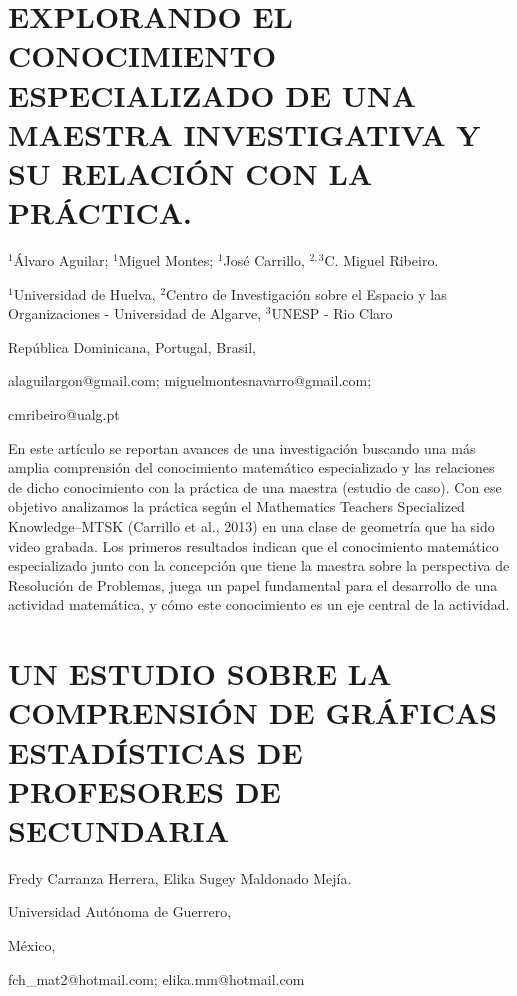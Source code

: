 \section{\uppercase{ Explorando el Conocimiento especializado de una maestra
investigativA y su relación con la práctica.}}

\begin{datos}

$^{1}$Álvaro Aguilar; $^{1}$Miguel Montes; $^{1}$José Carrillo,
$^{2,3}$C. Miguel Ribeiro.

$^{1}$Universidad de Huelva, $^{2}$Centro de Investigación sobre
el Espacio y las Organizaciones - Universidad de Algarve, $^{3}$UNESP
- Rio Claro 

República Dominicana, Portugal, Brasil,

alaguilargon@gmail.com; miguelmontesnavarro@gmail.com; 

cmribeiro@ualg.pt 

\end{datos}

En este artículo se reportan avances de una investigación buscando
una más amplia comprensión del conocimiento matemático especializado
y las relaciones de dicho conocimiento con la práctica de una maestra
(estudio de caso). Con ese objetivo analizamos la práctica según el
Mathematics Teachers Specialized Knowledge–MTSK (Carrillo et al.,
2013) en una clase de geometría que ha sido video grabada. Los primeros
resultados indican que el conocimiento matemático especializado junto
con la concepción que tiene la maestra sobre la perspectiva de Resolución
de Problemas, juega un papel fundamental para el desarrollo de una
actividad matemática, y cómo este conocimiento es un eje central de
la actividad.


\section{UN ESTUDIO SOBRE LA COMPRENSIÓN DE GRÁFICAS ESTADÍSTICAS DE PROFESORES
DE SECUNDARIA}

\begin{datos}

Fredy Carranza Herrera, Elika Sugey Maldonado Mejía.

Universidad Autónoma de Guerrero,

México,

fch\_mat2@hotmail.com; elika.mm@hotmail.com 

\end{datos}

